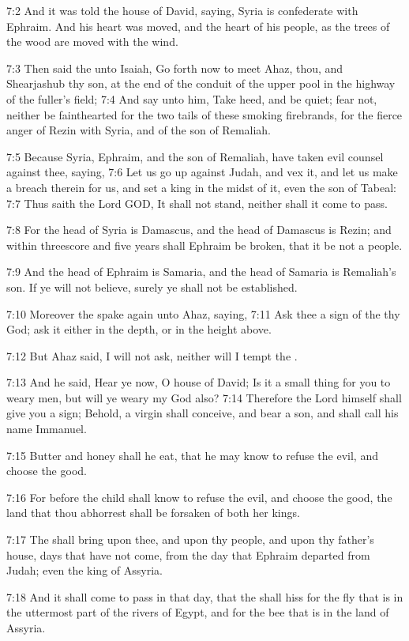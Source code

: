 7:2 And it was told the house of David, saying, Syria is confederate
with Ephraim. And his heart was moved, and the heart of his people, as
the trees of the wood are moved with the wind.

7:3 Then said the \LORD unto Isaiah, Go forth now to meet Ahaz, thou,
and Shearjashub thy son, at the end of the conduit of the upper pool
in the highway of the fuller's field; 7:4 And say unto him, Take heed,
and be quiet; fear not, neither be fainthearted for the two tails of
these smoking firebrands, for the fierce anger of Rezin with Syria,
and of the son of Remaliah.

7:5 Because Syria, Ephraim, and the son of Remaliah, have taken evil
counsel against thee, saying, 7:6 Let us go up against Judah, and vex
it, and let us make a breach therein for us, and set a king in the
midst of it, even the son of Tabeal: 7:7 Thus saith the Lord GOD, It
shall not stand, neither shall it come to pass.

7:8 For the head of Syria is Damascus, and the head of Damascus is
Rezin; and within threescore and five years shall Ephraim be broken,
that it be not a people.

7:9 And the head of Ephraim is Samaria, and the head of Samaria is
Remaliah's son. If ye will not believe, surely ye shall not be
established.

7:10 Moreover the \LORD spake again unto Ahaz, saying, 7:11 Ask thee a
sign of the \LORD thy God; ask it either in the depth, or in the height
above.

7:12 But Ahaz said, I will not ask, neither will I tempt the \LORD.

7:13 And he said, Hear ye now, O house of David; Is it a small thing
for you to weary men, but will ye weary my God also?  7:14 Therefore
the Lord himself shall give you a sign; Behold, a virgin shall
conceive, and bear a son, and shall call his name Immanuel.

7:15 Butter and honey shall he eat, that he may know to refuse the
evil, and choose the good.

7:16 For before the child shall know to refuse the evil, and choose
the good, the land that thou abhorrest shall be forsaken of both her
kings.

7:17 The \LORD shall bring upon thee, and upon thy people, and upon thy
father's house, days that have not come, from the day that Ephraim
departed from Judah; even the king of Assyria.

7:18 And it shall come to pass in that day, that the \LORD shall hiss
for the fly that is in the uttermost part of the rivers of Egypt, and
for the bee that is in the land of Assyria.

